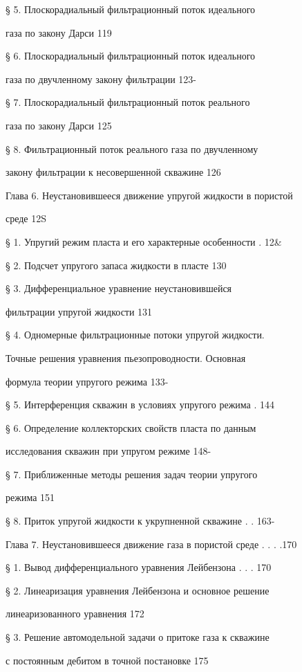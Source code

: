 \documentclass[
  11pt,
]{article}
\begin{document}
§ 5. Плоскорадиальный фильтрационный поток идеального \par
газа по закону Дарси 119 \par
§ 6. Плоскорадиальный фильтрационный поток идеального \par
газа по двучленному закону фильтрации 123- \par
§ 7. Плоскорадиальный фильтрационный поток реального \par
газа по закону Дарси 125 \par
§ 8. Фильтрационный поток реального газа по двучленному \par
закону фильтрации к несовершенной скважине 126 \par
Глава 6. Неустановившееся движение упругой жидкости в пористой \par
среде 12S \par
§ 1. Упругий режим пласта и его характерные особенности . 12\& \par
§ 2. Подсчет упругого запаса жидкости в пласте 130 \par
§ 3. Дифференциальное уравнение неустановившейся  \par
фильтрации упругой жидкости 131 \par
§ 4. Одномерные фильтрационные потоки упругой жидкости. \par
Точные решения уравнения пьезопроводности. Основная  \par
формула теории упругого режима 133- \par
§ 5. Интерференция скважин в условиях упругого режима . 144 \par
§ 6. Определение коллекторских свойств пласта по данным \par
исследования скважин при упругом режиме 148- \par
§ 7. Приближенные методы решения задач теории упругого \par
режима 151 \par
§ 8. Приток упругой жидкости к укрупненной скважине . . 163- \par
Глава 7. Неустановившееся движение газа в пористой среде . . . .170 \par
§ 1. Вывод дифференциального уравнения Лейбензона . . . 170 \par
§ 2. Линеаризация уравнения Лейбензона и основное решение \par
линеаризованного уравнения 172 \par
§ 3. Решение автомодельной задачи о притоке газа к скважине \par
с постоянным дебитом в точной постановке 175 \par
\end{document}
